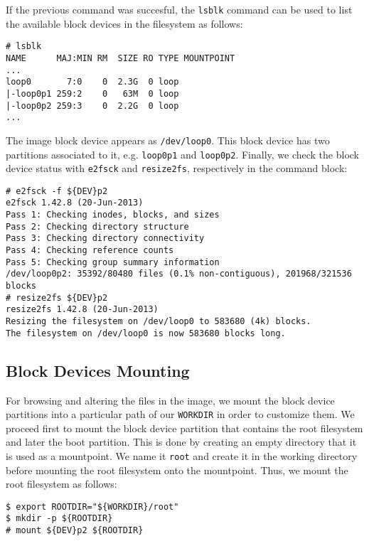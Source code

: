 If the previous command was succesful, the \texttt{lsblk} command can be used
to list the available block devices in the filesystem as follows:

\begin{lstlisting}[]
# lsblk
NAME      MAJ:MIN RM  SIZE RO TYPE MOUNTPOINT
...
loop0       7:0    0  2.3G  0 loop
|-loop0p1 259:2    0   63M  0 loop
|-loop0p2 259:3    0  2.2G  0 loop
...
\end{lstlisting}
\FloatBarrier
\vspace{-5mm}

The image block device appears as \texttt{/dev/loop0}. This block device has
two partitions associated to it, e.g. \texttt{loop0p1} and \texttt{loop0p2}.
Finally, we check the block device status with \texttt{e2fsck} and
\texttt{resize2fs}, respectively in the command block:

\begin{lstlisting}[]
# e2fsck -f ${DEV}p2
e2fsck 1.42.8 (20-Jun-2013)
Pass 1: Checking inodes, blocks, and sizes
Pass 2: Checking directory structure
Pass 3: Checking directory connectivity
Pass 4: Checking reference counts
Pass 5: Checking group summary information
/dev/loop0p2: 35392/80480 files (0.1% non-contiguous), 201968/321536 blocks
# resize2fs ${DEV}p2
resize2fs 1.42.8 (20-Jun-2013)
Resizing the filesystem on /dev/loop0 to 583680 (4k) blocks.
The filesystem on /dev/loop0 is now 583680 blocks long.
\end{lstlisting}
\FloatBarrier

\subsection{Block Devices Mounting}
For browsing and altering the files in the image, we mount the block
device partitions into a particular path of our \texttt{WORKDIR} in order
to customize them. We proceed first to mount the block device partition that
contains the root filesystem and later the boot partition. This is done by
creating an empty directory that it is used as a mountpoint. We name it
\texttt{root} and create it in the working directory before mounting the
root filesystem onto the mountpoint. Thus, we mount the root filesystem
as follows:

\begin{lstlisting}[]
$ export ROOTDIR="${WORKDIR}/root"
$ mkdir -p ${ROOTDIR}
# mount ${DEV}p2 ${ROOTDIR}
\end{lstlisting}
\FloatBarrier
\vspace{-5mm}

